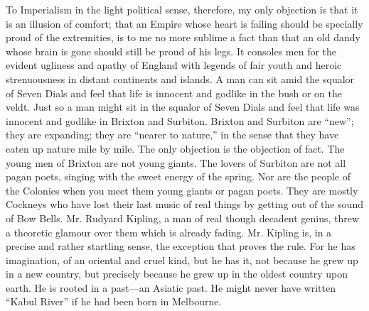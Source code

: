 \documentclass{book}
\begin{document}
To Imperialism in the light political sense, therefore, my only objection is that it is an illusion of comfort; that an Empire whose heart is failing should be specially proud of the extremities, is to me no more sublime a fact than that an old dandy whose brain is gone should still be proud of his legs. It consoles men for the evident ugliness and apathy of England with legends of fair youth and heroic strenuousness in distant continents and islands. A man can sit amid the squalor of Seven Dials and feel that life is innocent and godlike in the bush or on the veldt. Just so a man might sit in the squalor of Seven Dials and feel that life was innocent and godlike in Brixton and Surbiton. Brixton and Surbiton are “new”; they are expanding; they are “nearer to nature,” in the sense that they have eaten up nature mile by mile. The only objection is the objection of fact. The young men of Brixton are not young giants. The lovers of Surbiton are not all pagan poets, singing with the sweet energy of the spring. Nor are the people of the Colonies when you meet them young giants or pagan poets. They are mostly Cockneys who have lost their last music of real things by getting out of the sound of Bow Bells. Mr. Rudyard Kipling, a man of real though decadent genius, threw a theoretic glamour over them which is already fading. Mr. Kipling is, in a precise and rather startling sense, the exception that proves the rule. For he has imagination, of an oriental and cruel kind, but he has it, not because he grew up in a new country, but precisely because he grew up in the oldest country upon earth. He is rooted in a past—an Asiatic past. He might never have written “Kabul River” if he had been born in Melbourne.
\end{document}
